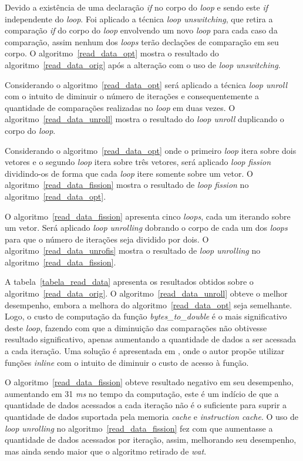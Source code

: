 Devido a existência de uma declaração \textit{if} no corpo do \textit{loop} e
sendo este \textit{if} independente do \textit{loop}. 
Foi aplicado a técnica \textit{loop unswitching}, que retira a comparação
\textit{if} do corpo do \textit{loop} envolvendo um novo \textit{loop} para cada caso
da comparação, assim nenhum dos \textit{loops} terão declações de comparação em seu
corpo.
O algoritmo~\ref{read_data_opt} mostra o resultado do
algoritmo~\ref{read_data_orig} após a alteração com o uso de \textit{loop unswitching}.

Considerando o algoritmo~\ref{read_data_opt} será aplicado a técnica 
\textit{loop unroll} com o intuito de diminuir o número de iterações e 
consequentemente a
quantidade de comparações realizadas no \textit{loop} em duas vezes. 
O algoritmo~\ref{read_data_unroll} mostra o resultado do \textit{loop
unroll} duplicando o corpo do \textit{loop}.

Considerando o algoritmo~\ref{read_data_opt} onde o primeiro \textit{loop} itera
sobre dois vetores e o segundo \textit{loop} itera
sobre três vetores, será aplicado \textit{loop fission} dividindo-os de forma
que cada \textit{loop} itere somente sobre um vetor.
O algoritmo~\ref{read_data_fission} mostra o resultado de \textit{loop fission}
no algoritmo~\ref{read_data_opt}.

O algoritmo~\ref{read_data_fission} apresenta cinco \textit{loops}, cada um
iterando sobre um vetor. Será aplicado \textit{loop unrolling} dobrando o corpo
de cada um dos \textit{loops} para que o número de iterações seja dividido por
dois.
O algoritmo~\ref{read_data_unrofis} mostra o resultado de \textit{loop
unrolling} no algoritmo~\ref{read_data_fission}.

A tabela~\ref{tabela_read_data} apresenta os resultados obtidos sobre o
algoritmo~\ref{read_data_orig}. 
O algoritmo~\ref{read_data_unroll} obteve o melhor desempenho, embora a melhora
do algoritmo~\ref{read_data_opt} seja semelhante. 
Logo, o custo de computação da função \textit{bytes\_to\_double} é o mais
significativo deste \textit{loop}, fazendo com que a diminuição das comparações
não obtivesse resultado significativo, apenas aumentando a quantidade de dados a
ser acessada a cada iteração. 
Uma solução é apresentada em \cite{Miniskar:2012}, 
onde o autor propõe utilizar funções \textit{inline} com o intuito de diminuir o custo
de acesso à função.

O algoritmo~\ref{read_data_fission} obteve resultado negativo em seu desempenho,
aumentando em 31 \textit{ms} no tempo da computação, este é um indício de que a
quantidade de dados acessados a cada iteração não é o suficiente para suprir a
quantidade de dados suportada pela memoria \textit{cache} e \textit{instruction
cache}. 
O uso de \textit{loop unrolling} no algoritmo~\ref{read_data_fission} fez com
que aumentasse a quantidade de dados acessados por iteração, assim, melhorando seu
desempenho, mas ainda sendo maior que o algoritmo retirado de \textit{wat}.

